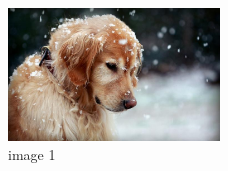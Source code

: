 \documentclass{article}
\begin{document}
	\begin{figure}
		\centering
		\includegraphics[width=0.5\textwidth]{GSYxmK.jpg}
		\caption{image 1}
		\label{fig:example}
	\end{figure}
\end{document}
